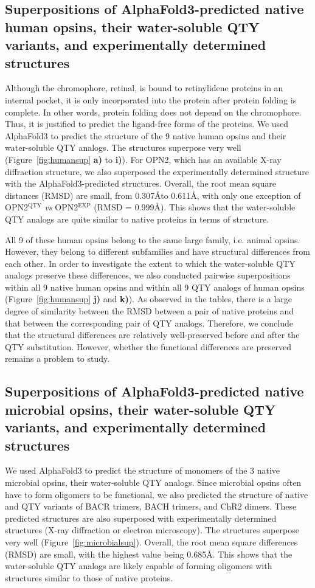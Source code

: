 \documentclass[fleqn, 10pt, lineno]{manuscript}
\begin{document}
\subsection*{Superpositions of AlphaFold3-predicted native human opsins, their water-soluble QTY variants, and experimentally determined structures}

Although the chromophore, retinal, is bound to retinylidene proteins in an internal pocket, it is only incorporated into the protein after protein folding is complete. In other words, protein folding does not depend on the chromophore. Thus, it is justified to predict the ligand-free forms of the proteins. We used AlphaFold3 to predict the structure of the 9 native human opsins and their water-soluble QTY analogs. The structures superpose very well (Figure~\ref{fig:humansup} \textbf{a)} to \textbf{i)}). For OPN2, which has an available X-ray diffraction structure, we also superposed the experimentally determined structure with the AlphaFold3-predicted structures. Overall, the root mean square distances (RMSD) are small, from 0.307\AA to 0.611\AA, with only one exception of OPN2$^{\textrm{QTY}}$ \textit{vs} OPN2$^{\textrm{EXP}}$ (RMSD = 0.999\AA). This shows that the water-soluble QTY analogs are quite similar to native proteins in terms of structure. 

All 9 of these human opsins belong to the same large family, i.e. animal opsins. However, they belong to different subfamilies and have structural differences from each other. In order to investigate the extent to which the water-soluble QTY analogs preserve these differences, we also conducted pairwise superpositions within all 9 native human opsins and within all 9 QTY analogs of human opsins (Figure~\ref{fig:humansup} \textbf{j)} and \textbf{k)}). As observed in the tables, there is a large degree of similarity between the RMSD between a pair of native proteins and that between the corresponding pair of QTY analogs. Therefore, we conclude that the structural differences are relatively well-preserved before and after the QTY substitution. However, whether the functional differences are preserved remains a problem to study. 

\subsection*{Superpositions of AlphaFold3-predicted native microbial opsins, their water-soluble QTY variants, and experimentally determined structures}

We used AlphaFold3 to predict the structure of monomers of the 3 native microbial opsins, their water-soluble QTY analogs. Since microbial opsins often have to form oligomers to be functional, we also predicted the structure of native and QTY variants of BACR trimers, BACH trimers, and ChR2 dimers. These predicted structures are also superposed with experimentally determined structures (X-ray diffraction or electron microscopy). The structures superpose very well (Figure~\ref{fig:microbialsup}). Overall, the root mean square differences (RMSD) are small, with the highest value being 0.685\AA. This shows that the water-soluble QTY analogs are likely capable of forming oligomers with structures similar to those of native proteins. 
\end{document}
